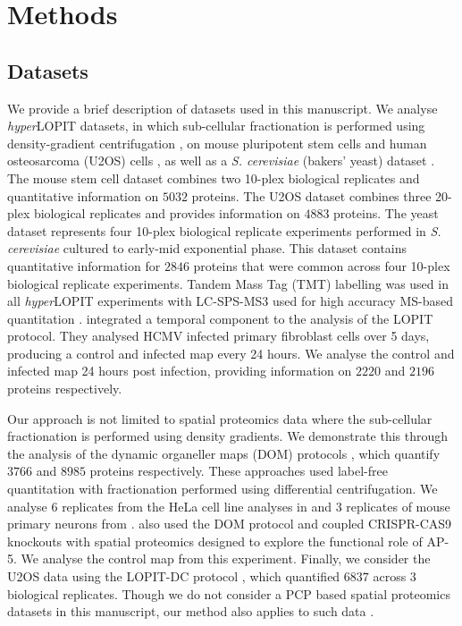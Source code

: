 \documentclass[12pt,english]{article}
\begin{document}
\section{Methods}
\subsection{Datasets}
We provide a brief description of datasets used in this manuscript. We analyse \textit{hyper}LOPIT datasets, in which sub-cellular fractionation is performed using density-gradient centrifugation \citep{Dunkley:2004, Dunkley:2006, Mulvey:2017}, on mouse pluripotent stem cells \citep{hyper} and human osteosarcoma (U2OS) cells \citep{Thul:2017, DC:2018}, as well as a \textit{S. cerevisiae} (bakers' yeast) dataset \citep{Nightingale::2019}. The mouse stem cell dataset combines two 10-plex biological replicates and quantitative information on $5032$ proteins. The U2OS dataset combines three 20-plex biological replicates and provides information on $4883$ proteins. The yeast dataset represents four 10-plex biological replicate experiments performed in \textit{S. cerevisiae} cultured to early-mid exponential phase. This dataset contains quantitative information for $2846$ proteins that were common across four 10-plex biological replicate experiments. Tandem Mass Tag (TMT) \citep{Thompson:2003} labelling was used in all \textit{hyper}LOPIT experiments with LC-SPS-MS3 used for high accuracy MS-based quantitation \citep{Ting:2011, Mcalister::2014}. \cite{Jean_Beltran:2016} integrated a temporal component to the analysis of the LOPIT protocol. They analysed HCMV infected primary fibroblast cells over 5 days, producing a control and infected map every 24 hours. We analyse the control and infected map 24 hours post infection, providing information on $2220$ and $2196$ proteins respectively. 

Our approach is not limited to spatial proteomics data where the sub-cellular fractionation is performed using density gradients. We demonstrate this through the analysis of the dynamic organeller maps (DOM) protocols \citep{Itzhak:2016, Itzhak::2017}, which quantify $3766$ and $8985$ proteins respectively. These approaches used label-free quantitation with fractionation performed using differential centrifugation. We analyse $6$ replicates from the HeLa cell line analyses in \cite{Itzhak:2016} and $3$ replicates of mouse primary neurons from \cite{Itzhak::2017}. \cite{Hirst:2018} also used the DOM protocol and coupled CRISPR-CAS9 knockouts with spatial proteomics designed to explore the functional role of AP-5. We analyse the control map from this experiment. Finally, we consider the U2OS data using the LOPIT-DC protocol \citep{DC:2018}, which quantified $6837$ across $3$ biological replicates. Though we do not consider a PCP based spatial proteomics datasets in this manuscript, our method also applies to such data \citep{Foster:2006, kristensen:2012, kristensen:2014}.
\end{document}
